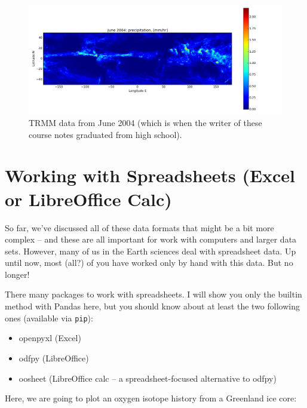\documentclass[a4paper,10pt]{scrartcl}
\begin{document}
\begin{figure}[!ht]
\begin{center}
\includegraphics[width=.9\linewidth]{figures/FilesData/TRMM200406.png}
\end{center}
\caption{TRMM data from June 2004 (which is when the writer of these course notes graduated from high school).}
\end{figure}

\section{Working with Spreadsheets (Excel or LibreOffice Calc)}

So far, we've discussed all of these data formats that might be a bit more complex -- and these are all important for work with computers and larger data sets. However, many of us in the Earth sciences deal with spreadsheet data. Up until now, most (all?) of you have worked only by hand with this data. But no longer!

There many packages to work with spreadsheets. I will show you only the builtin method with Pandas here, but you should know about at least the two following ones (available via \lstinline{pip}):
\begin{itemize}
 \item openpyxl (Excel)
 \item odfpy (LibreOffice)
 \item oosheet (LibreOffice calc -- a spreadsheet-focused alternative to odfpy)
\end{itemize}

Here, we are going to plot an oxygen isotope history from a Greenland ice core:


\end{document}
